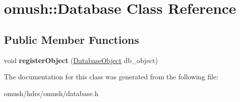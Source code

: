 \hypertarget{classomush_1_1_database}{\section{omush\-:\-:Database Class Reference}
\label{classomush_1_1_database}
}
\subsection*{Public Member Functions}
\begin{DoxyCompactItemize}
\item 
\hypertarget{classomush_1_1_database_adc550494a71f3c39bd19d4ff7cb3c1c0}{void {\bfseries register\-Object} (\hyperlink{classomush_1_1_database_object}{Database\-Object} db\-\_\-object)}\label{classomush_1_1_database_adc550494a71f3c39bd19d4ff7cb3c1c0}

\end{DoxyCompactItemize}


The documentation for this class was generated from the following file\-:\begin{DoxyCompactItemize}
\item 
omush/hdrs/omush/database.\-h\end{DoxyCompactItemize}
